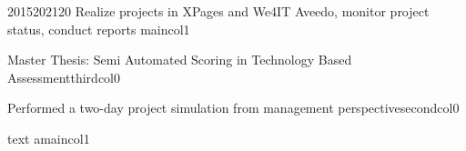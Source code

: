 \documentclass[10pt,A4]{article}
\begin{document}
\begin{minipage}{0.4\textwidth}
\begin{center}
\begin{cvtimeline}{2015}{2021}{20}{\linewidth}
    {Realize projects in XPages and We4IT Aveedo, monitor project status, conduct reports}
    {maincol}{1}

    {Master Thesis: Semi Automated Scoring in Technology Based Assessment}{thirdcol}{0}

    {Performed a two-day project simulation from management perspective}{secondcol}{0}

    {text a}{maincol}{1}
        
\end{cvtimeline}
\end{center}
\end{minipage}
%
%
%
%
%
%
\end{document}
